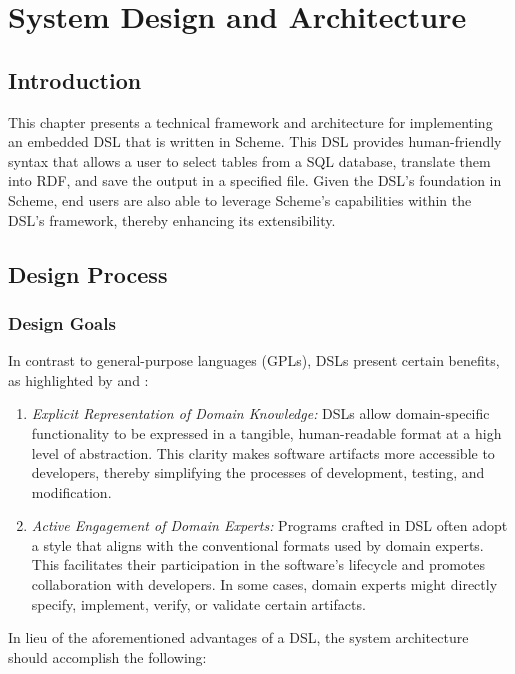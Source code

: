 \chapter{System Design and Architecture}

\section{Introduction}

This chapter presents a technical framework and architecture for implementing an embedded DSL that is written in Scheme.  This DSL provides human-friendly syntax that allows a user to select tables from a SQL database, translate them into RDF, and save the output in a specified file.  Given the DSL's foundation in Scheme, end users are also able to leverage Scheme's capabilities within the DSL's framework, thereby enhancing its extensibility.

\section{Design Process}

\subsection{Design Goals}

In contrast to general-purpose languages (GPLs), DSLs present certain benefits, as highlighted by \citet{freudenthal2010domain} and \citet{spinellis2001notable}:

\begin{enumerate}
\item \textit{Explicit Representation of Domain Knowledge:} DSLs allow domain-specific functionality to be expressed in a tangible, human-readable format at a high level of abstraction. This clarity makes software artifacts more accessible to developers, thereby simplifying the processes of development, testing, and modification.
\item \textit{Active Engagement of Domain Experts:} Programs crafted in DSL often adopt a style that aligns with the conventional formats used by domain experts. This facilitates their participation in the software's lifecycle and promotes collaboration with developers. In some cases, domain experts might directly specify, implement, verify, or validate certain artifacts.
\end{enumerate}

In lieu of the aforementioned advantages of a DSL, the system architecture should accomplish the following:

